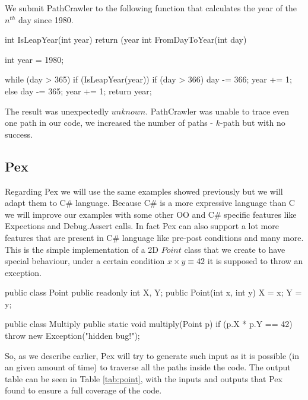 \documentclass[10pt, conference, compsocconf]{IEEEtran}
\begin{document}
We submit PathCrawler to the following function that calculates the year of the $n^{th}$ day since 1980.

\begin{code}
int IsLeapYear(int year) {
  return (year %
}
int FromDayToYear(int day) {
  int year = 1980;

  while (day > 365) {
    if (IsLeapYear(year)) {
      if (day > 366) {
        day -= 366;
        year += 1;
      }
    } else {
      day -= 365;
      year += 1;
    }
  }
  return year;
}
\end{code}

The result was unexpectedly $unknown$. PathCrawler was unable to trace even one path in our code, we increased the number of paths - $k$-path but with no success.

\subsection{Pex}
Regarding Pex we will use the same examples showed previously but we will adapt them to C\# language.
Because C\# is a more expressive language than C we will improve our examples with some other OO and C\# specific features like Expections and Debug.Assert calls.
In fact Pex can also support a lot more features that are present in C\# language like pre-post conditions and many more.\\
This is the simple implementation of a 2D $Point$ class that we create to have special behaviour, under a certain condition
$x \times y \equiv 42$ it is supposed to throw an exception.

\begin{code}
public class Point {
  public readonly int X, Y;
  public Point(int x, int y) { X = x; Y = y; }
}

public class Multiply {
  public static void multiply(Point p) {
    if (p.X * p.Y == 42)
        throw new Exception("hidden bug!");
  }
}
\end{code}

So, as we describe earlier, Pex will try to generate such input as it is possible (in an given amount of time) to traverse all the paths inside the code.
The output table can be seen in Table \ref{tab:point}, with the inputs and outputs that Pex found to ensure a full coverage of the code.
\end{document}
